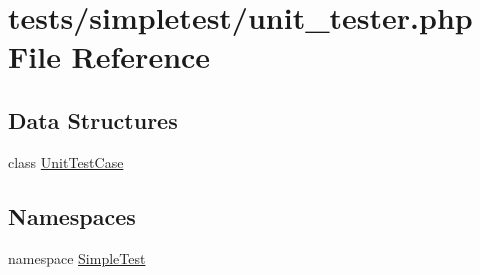 \hypertarget{unit__tester_8php}{\section{tests/simpletest/unit\-\_\-tester.php File Reference}
\label{unit__tester_8php}
}
\subsection*{Data Structures}
\begin{DoxyCompactItemize}
\item 
class \hyperlink{class_unit_test_case}{Unit\-Test\-Case}
\end{DoxyCompactItemize}
\subsection*{Namespaces}
\begin{DoxyCompactItemize}
\item 
namespace \hyperlink{namespace_simple_test}{Simple\-Test}
\end{DoxyCompactItemize}
